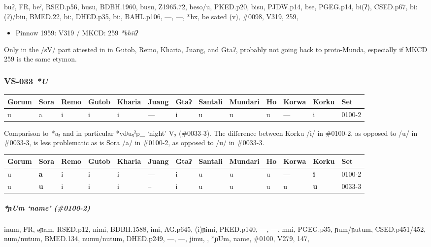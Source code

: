 \documentclass[a4paper,]{article}
\providecommand{\tightlist}{%
  \setlength{\itemsep}{0pt}\setlength{\parskip}{0pt}}
\let\oldsubparagraph\subparagraph
\renewcommand{\subparagraph}[1]{\oldsubparagraph{#1}\mbox{}}
\begin{document}
buʔ, FR, beˀ, RSED.p56, busu, BDBH.1960, busu, Z1965.72, beso/u,
PKED.p20, bisu, PJDW.p14, bse, PGEG.p14, bi(ʔ), CSED.p67, bi:(ʔ)/biu,
BMED.22, bi:, DHED.p35, bi:, BAHL.p106, ---, ---, *bx, be sated (v),
\#0098, V319, 259,

\begin{itemize}
\tightlist
\item
  Pinnow 1959: V319 / MKCD: 259 \emph{*bhiiʔ}
\end{itemize}

Only in the /sV/ part attested in in Gutob, Remo, Kharia, Juang, and
Gtaʔ, probably not going back to proto-Munda, especially if MKCD 259 is
the same etymon.

\subsubsection{\texorpdfstring{VS-033
\emph{*U}}{VS-033 *U}}\label{vs-033-u}

\begin{longtable}[]{@{}lllllllllllll@{}}
\toprule
Gorum & Sora & Remo & Gutob & Kharia & Juang & Gtaʔ & Santali & Mundari
& Ho & Korwa & Korku & Set\tabularnewline
\midrule
\endhead
u & a & i & i & i & --- & i & u & u & u & --- & i &
0100-2\tabularnewline
\bottomrule
\end{longtable}

Comparison to \emph{*u₅} and in particular *vdʲu₅ˀp\_ `night' V₂
(\#0033-3). The difference between Korku /i/ in \#0100-2, as opposed to
/u/ in \#0033-3, is less problematic as is Sora /a/ in \#0100-2, as
opposed to /u/ in \#0033-3.

\begin{longtable}[]{@{}lllllllllllll@{}}
\toprule
Gorum & Sora & Remo & Gutob & Kharia & Juang & Gtaʔ & Santali & Mundari
& Ho & Korwa & Korku & Set\tabularnewline
\midrule
\endhead
u & \textbf{a} & i & i & i & --- & i & u & u & u & --- & \textbf{i} &
0100-2\tabularnewline
u & \textbf{u} & i & i & i & -- & i & u & u & u & u & \textbf{u} &
0033-3\tabularnewline
\bottomrule
\end{longtable}

\subparagraph{\texorpdfstring{\emph{*ɲUm} `name'
(\#0100-2)}{*ɲUm name (\#0100-2)}}\label{ux272um-name-0100-2}

inum, FR, əɲam, RSED.p12, nimi, BDBH.1588, imi, AG.p645, (i)ɲimi,
PKED.p140, ---, ---, mni, PGEG.p35, ɲum/ɲutum, CSED.p451/452, num/nutum,
BMED.134, numu/nutum, DHED.p249, ---, ---, jimu, , *ɲUm, name, \#0100,
V279, 147,
\end{document}
